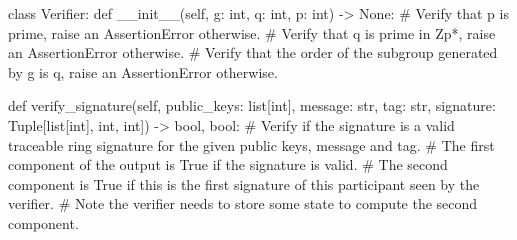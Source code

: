 \begin{python}
class Verifier:
	def __init__(self, g: int, q: int, p: int) -> None:
		# Verify that p is prime, raise an AssertionError otherwise.
		# Verify that q is prime in Zp*, raise an AssertionError otherwise.
		# Verify that the order of the subgroup generated by g is q, raise an AssertionError otherwise.

	def verify_signature(self, public_keys: list[int], message: str, tag: str, signature: Tuple[list[int], int, int]) -> bool, bool:
		# Verify if the signature is a valid traceable ring signature for the given public keys, message and tag.
		# The first component of the output is True if the signature is valid.
		# The second component is True if this is the first signature of this participant seen by the verifier.
		# Note the verifier needs to store some state to compute the second component.
\end{python}

\medskip
